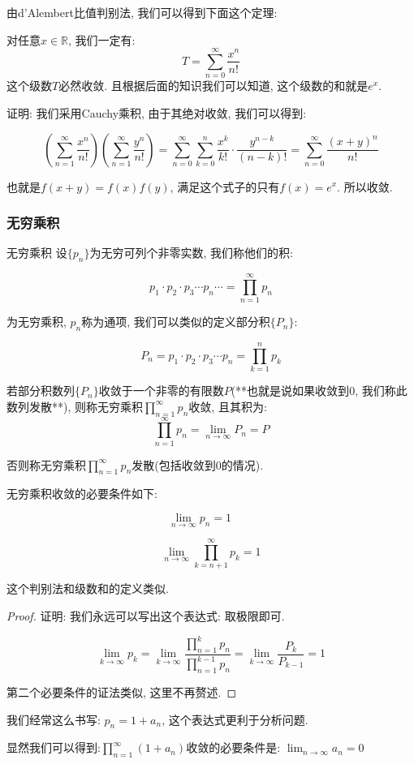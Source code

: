 \documentclass[a4paper,12pt]{ctexart}
\begin{document}
由d'Alembert比值判别法, 我们可以得到下面这个定理:

\newpage

\begin{mythm}{}{}
对任意$x \in \mathbb{R}$, 我们一定有:
\[
T = \sum_{n=0}^{\infty} \frac{x^n}{n!}
\]
这个级数$T$必然收敛. 且根据后面的知识我们可以知道, 这个级数的和就是$e^x$.
\end{mythm}

证明: 我们采用Cauchy乘积, 由于其绝对收敛, 我们可以得到:

\[
\left( \sum_{n=1}^{\infty} \frac{x^n}{n!} \right) \left( \sum_{n=1}^{\infty} \frac{y^n}{n!} \right) = \sum_{n=0}^{\infty} \sum_{k=0}^{n} \frac{x^k}{k!} \cdot \frac{y^{n-k}}{(n-k)!} = \sum_{n=0}^{\infty} \frac{(x+y)^n}{n!}
\]

也就是$f(x+y) = f(x)f(y)$, 满足这个式子的只有$f(x) = e^x$. 所以收敛.


\newpage
\subsubsection{无穷乘积}

\begin{mydef}{无穷乘积}{}
设$\{p_n\}$为无穷可列个非零实数, 我们称他们的积:

\[
p_1 \cdot p_2 \cdot p_3 \cdots p_n \cdots = \prod_{n=1}^{\infty} p_n
\]

为无穷乘积, $p_n$称为通项, 我们可以类似的定义部分积$\{P_n\}$:

\[
P_n = p_1 \cdot p_2 \cdot p_3 \cdots p_n = \prod_{k=1}^{n} p_k
\]

若部分积数列$\{P_n\}$收敛于一个非零的有限数$P$(**也就是说如果收敛到$0$, 我们称此数列发散**), 则称无穷乘积$\prod_{n=1}^{\infty} p_n$收敛, 且其积为:
\[
\prod_{n=1}^{\infty} p_n = \lim_{n \to \infty} P_n = P
\]

否则称无穷乘积$\prod_{n=1}^{\infty} p_n$发散(包括收敛到$0$的情况).
\end{mydef}

\begin{mythm}{}{}

无穷乘积收敛的必要条件如下:

$$\lim_{n \to \infty} p_n = 1 \quad \quad$$

$$\lim_{n\to \infty} \prod_{k=n+1}^{\infty} p_k = 1$$

这个判别法和级数和的定义类似.
    
\end{mythm}

\begin{proof}

证明: 我们永远可以写出这个表达式: 取极限即可.

$$
\lim_{k \to \infty} p_k = \lim_{k \to \infty}\frac{\prod_{n=1}^k p_n}{\prod_{n=1}^{k-1} p_n} =\lim_{k \to \infty} \frac{P_k}{P_{k-1}} = 1
$$

第二个必要条件的证法类似, 这里不再赘述.
\end{proof}

\begin{myprop}{}{}
我们经常这么书写: $p_n = 1+ a_n$, 这个表达式更利于分析问题.

显然我们可以得到:$\prod_{n=1}^{\infty} (1+a_n)$收敛的必要条件是: $\lim_{n \to \infty} a_n = 0$
\end{myprop}
\end{document}
